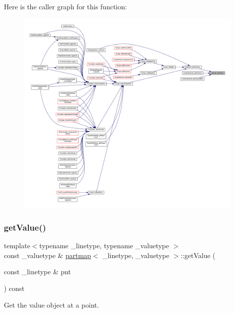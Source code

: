 Here is the caller graph for this function\+:
\nopagebreak
\begin{figure}[H]
\begin{center}
\leavevmode
\includegraphics[width=350pt]{classpartmap_af5e8ac68250b9e90bef2481df65bdeb3_icgraph}
\end{center}
\end{figure}
\mbox{\label{classpartmap_a2bb428c33ce4c264eafe568c17e9096c}} 
\subsubsection{\texorpdfstring{getValue()}{getValue()}\hspace{0.1cm}{\footnotesize\ttfamily [2/2]}}
{\footnotesize\ttfamily template$<$typename \+\_\+linetype, typename \+\_\+valuetype $>$ \\
const \+\_\+valuetype \& \mbox{\hyperlink{classpartmap}{partmap}}$<$ \+\_\+linetype, \+\_\+valuetype $>$\+::get\+Value (\begin{DoxyParamCaption}\item[{const \+\_\+linetype \&}]{pnt }\end{DoxyParamCaption}) const}



Get the value object at a point. 

